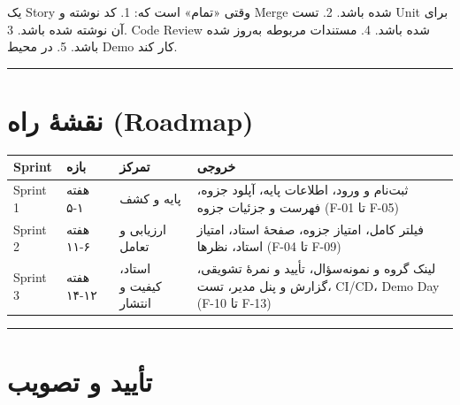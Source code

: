 \documentclass[12pt, a4paper]{article}
\begin{document}
یک Story وقتی «تمام» است که:
1. کد نوشته و Merge شده باشد.
2. تست Unit برای آن نوشته شده باشد.
3. Code Review شده باشد.
4. مستندات مربوطه به‌روز شده باشد.
5. در محیط Demo کار کند.

\begin{center}\rule{0.5\linewidth}{0.5pt}\end{center}

\section{نقشهٔ راه (Roadmap)}

{\def\LTcaptype{none} %
\begin{longtable}[]{@{}
  >{\raggedright\arraybackslash}p{}
  >{\raggedright\arraybackslash}p{}
  >{\raggedright\arraybackslash}p{}
  >{\raggedright\arraybackslash}p{}@{}}
\toprule\noalign{}
\begin{minipage}[b]{\linewidth}\raggedright
Sprint
\end{minipage} & \begin{minipage}[b]{\linewidth}\raggedright
بازه
\end{minipage} & \begin{minipage}[b]{\linewidth}\raggedright
تمرکز
\end{minipage} & \begin{minipage}[b]{\linewidth}\raggedright
خروجی
\end{minipage} \\
\midrule\noalign{}
\endhead
\bottomrule\noalign{}
\endlastfoot
Sprint 1 & هفته ۱-۵ & پایه و کشف & ثبت‌نام و ورود، اطلاعات پایه، آپلود جزوه، فهرست و جزئیات جزوه (F-01 تا F-05) \\
Sprint 2 & هفته ۶-۱۱ & ارزیابی و تعامل & فیلتر کامل، امتیاز جزوه، صفحهٔ استاد، امتیاز استاد، نظرها (F-04 تا F-09) \\
Sprint 3 & هفته ۱۲-۱۴ & استاد، کیفیت و انتشار & لینک گروه و نمونه‌سؤال، تأیید و نمرهٔ تشویقی، گزارش و پنل مدیر، تست، CI/CD، Demo Day (F-10 تا F-13) \\
\end{longtable}
}

\begin{center}\rule{0.5\linewidth}{0.5pt}\end{center}

\section{تأیید و تصویب}
\end{document}
